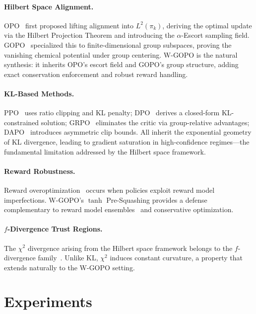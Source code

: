 \documentclass[11pt]{article}
\theoremstyle{definition}
\theoremstyle{remark}
\newcommand{\pik}{\pi_k}
\begin{document}
\paragraph{Hilbert Space Alignment.}
OPO~\cite{Wang2025OPO} first proposed lifting alignment into $L^2(\pik)$, deriving the optimal update via the Hilbert Projection Theorem and introducing the $\alpha$-Escort sampling field. GOPO~\cite{Wang2025GOPO} specialized this to finite-dimensional group subspaces, proving the vanishing chemical potential under group centering. W-GOPO is the natural synthesis: it inherits OPO's escort field and GOPO's group structure, adding exact conservation enforcement and robust reward handling.

\paragraph{KL-Based Methods.}
PPO~\cite{Schulman2017PPO} uses ratio clipping and KL penalty; DPO~\cite{Rafailov2023DPO} derives a closed-form KL-constrained solution; GRPO~\cite{Shao2024GRPO} eliminates the critic via group-relative advantages; DAPO~\cite{Yu2025DAPO} introduces asymmetric clip bounds. All inherit the exponential geometry of KL divergence, leading to gradient saturation in high-confidence regimes---the fundamental limitation addressed by the Hilbert space framework.

\paragraph{Reward Robustness.}
Reward overoptimization~\cite{Gao2023Scaling} occurs when policies exploit reward model imperfections. W-GOPO's $\tanh$ Pre-Squashing provides a defense complementary to reward model ensembles~\cite{Coste2024Reward} and conservative optimization.

\paragraph{$f$-Divergence Trust Regions.}
The $\chi^2$ divergence arising from the Hilbert space framework belongs to the $f$-divergence family~\cite{Csiszar1967,AliSilvey1966}. Unlike KL, $\chi^2$ induces constant curvature, a property that extends naturally to the W-GOPO setting.

\section{Experiments}
\label{sec:experiments}
\end{document}
